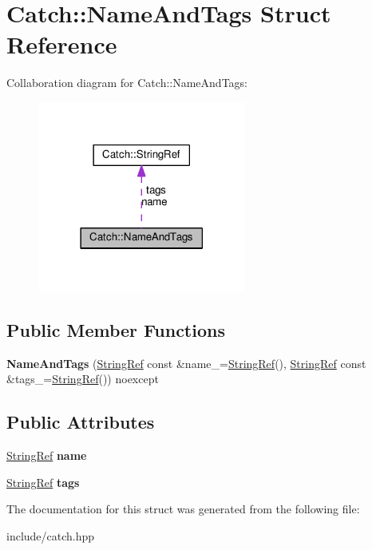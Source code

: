 \hypertarget{structCatch_1_1NameAndTags}{}\section{Catch\+:\+:Name\+And\+Tags Struct Reference}
\label{structCatch_1_1NameAndTags}


Collaboration diagram for Catch\+:\+:Name\+And\+Tags\+:\nopagebreak
\begin{figure}[H]
\begin{center}
\leavevmode
\includegraphics[width=194pt]{structCatch_1_1NameAndTags__coll__graph}
\end{center}
\end{figure}
\subsection*{Public Member Functions}
\begin{DoxyCompactItemize}
\item 
{\bfseries Name\+And\+Tags} (\hyperlink{classCatch_1_1StringRef}{String\+Ref} const \&name\+\_\+=\hyperlink{classCatch_1_1StringRef}{String\+Ref}(), \hyperlink{classCatch_1_1StringRef}{String\+Ref} const \&tags\+\_\+=\hyperlink{classCatch_1_1StringRef}{String\+Ref}()) noexcept\hypertarget{structCatch_1_1NameAndTags_ab585111e615ce8c504a2b9630de8ee94}{}\label{structCatch_1_1NameAndTags_ab585111e615ce8c504a2b9630de8ee94}

\end{DoxyCompactItemize}
\subsection*{Public Attributes}
\begin{DoxyCompactItemize}
\item 
\hyperlink{classCatch_1_1StringRef}{String\+Ref} {\bfseries name}\hypertarget{structCatch_1_1NameAndTags_a7cbea60e0cebfa622c667008eb011420}{}\label{structCatch_1_1NameAndTags_a7cbea60e0cebfa622c667008eb011420}

\item 
\hyperlink{classCatch_1_1StringRef}{String\+Ref} {\bfseries tags}\hypertarget{structCatch_1_1NameAndTags_a74062ed1138834a348424eb7ed900c57}{}\label{structCatch_1_1NameAndTags_a74062ed1138834a348424eb7ed900c57}

\end{DoxyCompactItemize}


The documentation for this struct was generated from the following file\+:\begin{DoxyCompactItemize}
\item 
include/catch.\+hpp\end{DoxyCompactItemize}
